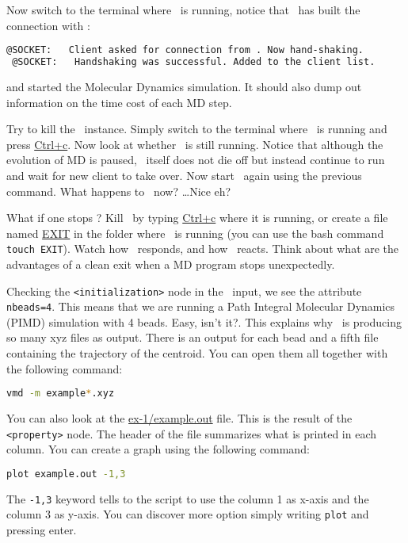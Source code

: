 \documentclass{article}
\begin{document}
\begin{Exercise}[label={i-pi},title={Molecular Dynamics: a client/server approach}]
\Question
Now switch to the terminal where \ipi\ is running, notice
that \ipi\ has built the connection with \pwx:
\begin{lstlisting}[language=sh]
 @SOCKET:   Client asked for connection from . Now hand-shaking.
 @SOCKET:   Handshaking was successful. Added to the client list.
\end{lstlisting}
and started the Molecular Dynamics simulation.
It should also dump out information on the time cost of each MD step.

\Question
Try to kill the \pwx\ instance.  Simply switch to the
terminal where \pwx\ is running and press \url{Ctrl+c}.  Now look at
whether \ipi\ is still running.  Notice that although the evolution of
MD is paused, \ipi\ itself does not die off but instead continue to
run and wait for new client to take over.  Now start \pwx\ again using
the previous command.
What happens to \ipi\ now?  \ldots Nice eh?


\Question
What if one stops \ipi ?  Kill \ipi\ by typing \url{Ctrl+c}
where it is running, or create a file named \url{EXIT} in the folder
where \ipi\ is running (you can use the bash command \texttt{touch
  EXIT}).  Watch how \ipi\ responds, and how \pwx\ reacts.  Think
about what are the advantages of a clean exit when a MD program stops
unexpectedly.


\Question
Checking the \texttt{<initialization>} node in the \ipi\ input, we see
the attribute \texttt{nbeads=4}. This means that we are running a Path
Integral Molecular Dynamics (PIMD) simulation with 4 beads. Easy, isn't it?.
This explains why \ipi\ is producing so many xyz files as output. There
is an output for each bead and a fifth file containing the trajectory
of the centroid. You can open them all together with the following
command:
\begin{lstlisting}[language=bash]
vmd -m example*.xyz
\end{lstlisting}
You can also look at the \url{ex-1/example.out} file. This is the
result of the \texttt{<property>} node. The header of the file
summarizes what is printed in each column. You can create a graph using
the following command:
\begin{lstlisting}[language=bash]
plot example.out -1,3
\end{lstlisting}
The \texttt{-1,3} keyword tells to the script to use the column 1 as
x-axis and the column 3 as y-axis. You can discover more option simply
writing \texttt{plot} and pressing enter.
\end{Exercise}
\vspace{1em}
\end{document}
